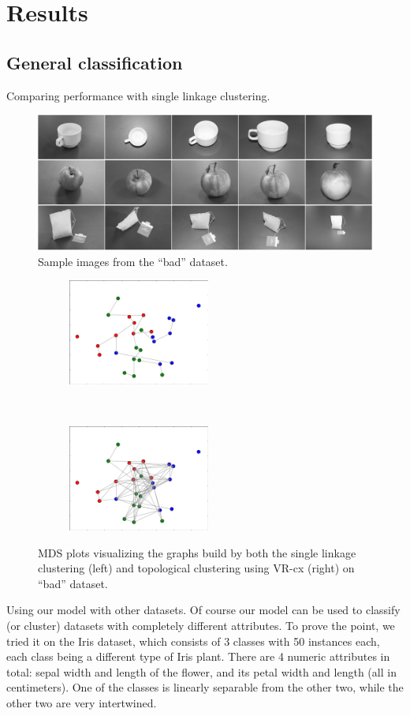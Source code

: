 \documentclass{article}
\newcommand{\enterProblemHeader}[1]{
}
\newcommand{\exitProblemHeader}[1]{
}
\newcounter{homeworkProblemCounter} %
\newcommand{\homeworkProblemName}{}
\newenvironment{homeworkProblem}[1][Problem \arabic{homeworkProblemCounter}]{ %
\stepcounter{homeworkProblemCounter} %
\renewcommand{\homeworkProblemName}{#1} %
\section{\homeworkProblemName} %
\enterProblemHeader{\homeworkProblemName} %
}{
\exitProblemHeader{\homeworkProblemName} %
}
\newcommand{\homeworkSectionName}{}
\newenvironment{homeworkSection}[1]{ %
\renewcommand{\homeworkSectionName}{#1} %
\subsection{\homeworkSectionName} %
\enterProblemHeader{\homeworkProblemName\ [\homeworkSectionName]} %
}{
\enterProblemHeader{\homeworkProblemName} %
}
\begin{document}
\begin{homeworkProblem}[Results]
\begin{homeworkSection}{General classification}
\begin{paragraph}{Comparing performance with single linkage clustering.}
\begin{figure}[t!]
    \centering
    \includegraphics[width=1\textwidth, keepaspectratio]{img/bad_dataset_sample}
    \caption{Sample images from the ``bad'' dataset.}
    \label{fig:baddata}
\end{figure}

\begin{figure}[t]
    \centering
    \begin{subfigure}[t]{0.4\textwidth}
        \centering
        \includegraphics[height=3.5cm]{img/bad_graph_sl}
    \end{subfigure}
   ~
    \begin{subfigure}[t]{0.4\textwidth}
        \centering
        \includegraphics[height=3.5cm]{img/bad_graph_tc}
        \end{subfigure}
  \caption{MDS plots visualizing the graphs build by both the single linkage clustering (left) and topological clustering using VR-cx (right) on ``bad'' dataset.}
  \label{fig:baddatagraphs}
\end{figure}

\end{paragraph}

\begin{paragraph}{Using our model with other datasets.}
  Of course our model can be used to classify (or cluster) datasets with completely different attributes. To prove the point, we tried it on the Iris dataset, which consists of 3 classes with 50 instances each, each class being a different type of Iris plant. There are 4 numeric attributes in total: sepal width and length of the flower, and its petal width and length  (all in centimeters). One of the classes is linearly separable from the other two, while the other two are very intertwined. 


\end{paragraph}
\end{homeworkSection}
\end{homeworkProblem}
\end{document}
